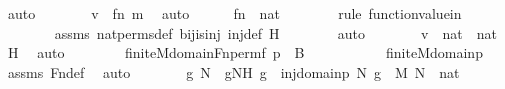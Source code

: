 \begin{isabellebody}
\ auto\isanewline
\ \ \ \ \isamarkupfalse%
\ \isamarkupfalse%
\ {\isachardoublequoteopen}v\ {\isacharequal}{\kern0pt}\ {\isacharless}{\kern0pt}f{\isacharbackquote}{\kern0pt}n{\isacharcomma}{\kern0pt}\ m{\isachargreater}{\kern0pt}{\isachardoublequoteclose}\ \isamarkupfalse%
\ auto\isanewline
\ \ \ \ \isamarkupfalse%
\ {\isachardoublequoteopen}f{\isacharbackquote}{\kern0pt}n\ {\isasymin}\ nat{\isachardoublequoteclose}\ \isanewline
\ \ \ \ \ \ \isamarkupfalse%
{\isacharparenleft}{\kern0pt}rule\ function{\isacharunderscore}{\kern0pt}value{\isacharunderscore}{\kern0pt}in{\isacharparenright}{\kern0pt}\isanewline
\ \ \ \ \ \ \isamarkupfalse%
\ assms\ nat{\isacharunderscore}{\kern0pt}perms{\isacharunderscore}{\kern0pt}def\ bij{\isacharunderscore}{\kern0pt}is{\isacharunderscore}{\kern0pt}inj\ inj{\isacharunderscore}{\kern0pt}def\ H\isanewline
\ \ \ \ \ \ \isamarkupfalse%
\ auto\isanewline
\ \ \ \ \isamarkupfalse%
\ \isamarkupfalse%
\ {\isachardoublequoteopen}v\ {\isasymin}\ nat\ {\isasymtimes}\ nat{\isachardoublequoteclose}\ \isamarkupfalse%
\ H\ \isamarkupfalse%
\ auto\isanewline
\ \ \isamarkupfalse%
\isanewline
\ \isanewline
\ \ \isamarkupfalse%
\ {\isachardoublequoteopen}finite{\isacharunderscore}{\kern0pt}M{\isacharparenleft}{\kern0pt}domain{\isacharparenleft}{\kern0pt}Fn{\isacharunderscore}{\kern0pt}perm{\isacharparenleft}{\kern0pt}f{\isacharcomma}{\kern0pt}\ p{\isacharparenright}{\kern0pt}{\isacharparenright}{\kern0pt}{\isacharparenright}{\kern0pt}{\isachardoublequoteclose}\ {\isacharparenleft}{\kern0pt}\ {\isacharquery}{\kern0pt}B{\isacharparenright}{\kern0pt}\isanewline
\ \ \isamarkupfalse%
\ {\isacharminus}{\kern0pt}\ \isanewline
\ \ \ \ \isamarkupfalse%
\ {\isachardoublequoteopen}finite{\isacharunderscore}{\kern0pt}M{\isacharparenleft}{\kern0pt}domain{\isacharparenleft}{\kern0pt}p{\isacharparenright}{\kern0pt}{\isacharparenright}{\kern0pt}{\isachardoublequoteclose}\ \isamarkupfalse%
\ assms\ Fn{\isacharunderscore}{\kern0pt}def\ \isamarkupfalse%
\ auto\isanewline
\ \ \ \ \isamarkupfalse%
\ \isamarkupfalse%
\ g\ N\ \ gNH{\isacharcolon}{\kern0pt}\ {\isachardoublequoteopen}g\ {\isasymin}\ inj{\isacharparenleft}{\kern0pt}domain{\isacharparenleft}{\kern0pt}p{\isacharparenright}{\kern0pt}{\isacharcomma}{\kern0pt}\ N{\isacharparenright}{\kern0pt}{\isachardoublequoteclose}\ {\isachardoublequoteopen}g\ {\isasymin}\ M{\isachardoublequoteclose}\ {\isachardoublequoteopen}N\ {\isasymin}\ nat{\isachardoublequoteclose}\ \isamarkupfalse%

\end{isabellebody}
